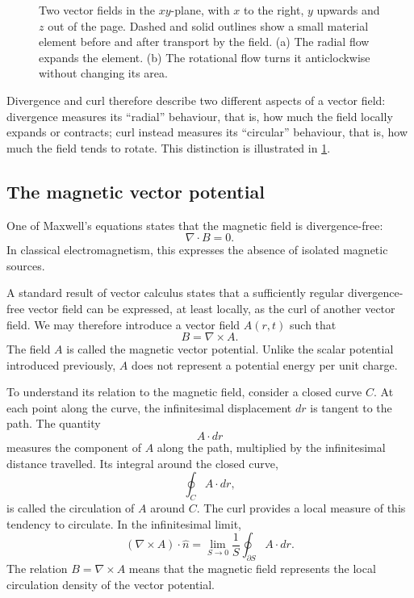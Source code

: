 \begin{figure}[H]
	\centering
	
	\caption{Two vector fields in the \(xy\)-plane, with \(x\) to the right,
		\(y\) upwards and \(z\) out of the page. Dashed and solid outlines show a
		small material element before and after transport by the field.
		(a) The radial flow expands the element.
		(b) The rotational flow turns it anticlockwise without changing its area.}
	\label{fig:divergence-curl}
\end{figure}

Divergence and curl therefore describe two different aspects of a vector field: divergence measures its ``radial'' behaviour, that is, how much the field locally expands or contracts; curl instead measures its ``circular'' behaviour, that is, how much the field tends to rotate. This distinction is illustrated in \cref{fig:divergence-curl}.


\subsection{The magnetic vector potential}
One of Maxwell's equations states that the magnetic field is divergence-free:
\[
	\nabla \cdot B = 0.
\]
In classical electromagnetism, this expresses the absence of isolated
magnetic sources.

A standard result of vector calculus states that a sufficiently regular
divergence-free vector field can be expressed, at least locally, as the
curl of another vector field. We may therefore introduce a vector field
\(A(r,t)\) such that
\[
	B = \nabla \times A.
\]
The field \(A\) is called the magnetic vector potential. Unlike the scalar
potential introduced previously, \(A\) does not represent a potential
energy per unit charge.

To understand its relation to the magnetic field, consider a closed curve
\(C\). At each point along the curve, the infinitesimal displacement
\(dr\) is tangent to the path. The quantity
\[
	A \cdot dr
\]
measures the component of \(A\) along the path, multiplied by the
infinitesimal distance travelled. Its integral around the closed curve,
\[
	\oint_{C} A \cdot dr,
\]
is called the circulation of \(A\) around \(C\).
\enlargethispage{0.5cm}
The curl provides a local measure of this tendency to circulate. In the
infinitesimal limit,
\[
	(\nabla \times A) \cdot \hat{n} =
	\lim_{S \to 0} \frac{1}{S}
	\oint_{\partial S} A \cdot dr.
\]
The relation \(B = \nabla \times A\) means that the magnetic field
represents the local circulation density of the vector potential.


